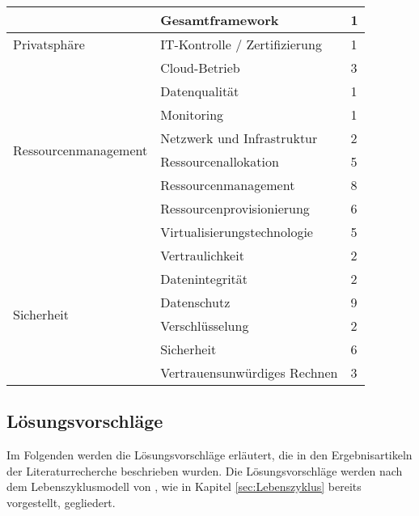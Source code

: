 \begin{table}
\begin{tabular}{|l|l|l|}
        & Gesamtframework & 1 \\ 
        \hline
        Privatsphäre & IT-Kontrolle / Zertifizierung & 1 \\ 
        \hline
        \multirow{8}{*}{Ressourcenmanagement} & Cloud-Betrieb & 3 \\ 
        \cline{2-3}
        & Datenqualität & 1 \\ 
        \cline{2-3}
        & Monitoring & 1 \\ 
        \cline{2-3}
        & Netzwerk und Infrastruktur & 2 \\ 
        \cline{2-3}
        & Ressourcenallokation & 5 \\ 
        \cline{2-3}
        & Ressourcenmanagement & 8 \\ 
        \cline{2-3}
        & Ressourcenprovisionierung & 6 \\ 
        \cline{2-3}
        & Virtualisierungstechnologie & 5 \\ 
        \hline
        \multirow{6}{*}{Sicherheit} & Vertraulichkeit & 2 \\ 
        \cline{2-3}
        & Datenintegrität & 2 \\ 
        \cline{2-3}
        & Datenschutz & 9 \\ 
        \cline{2-3}
        & Verschlüsselung & 2 \\ 
        \cline{2-3}
        & Sicherheit & 6 \\ 
        \cline{2-3}
        & Vertrauensunwürdiges Rechnen & 3 \\ 
        \hline
    \end{tabular}
    \caption{\HiTCC}
    \label{tab:Herausforderungen}
\end{table}
\newpage

\subsection{Lösungsvorschläge}
\label{sec:Loesungsvorschlaege}
Im Folgenden werden die Lösungsvorschläge erläutert, die in den Ergebnisartikeln der Literaturrecherche beschrieben wurden. Die Lösungsvorschläge werden nach dem Lebenszyklusmodell von \cite{Schneider.2013}, wie in Kapitel \ref{sec:Lebenszyklus} bereits vorgestellt, gegliedert.

%
%
